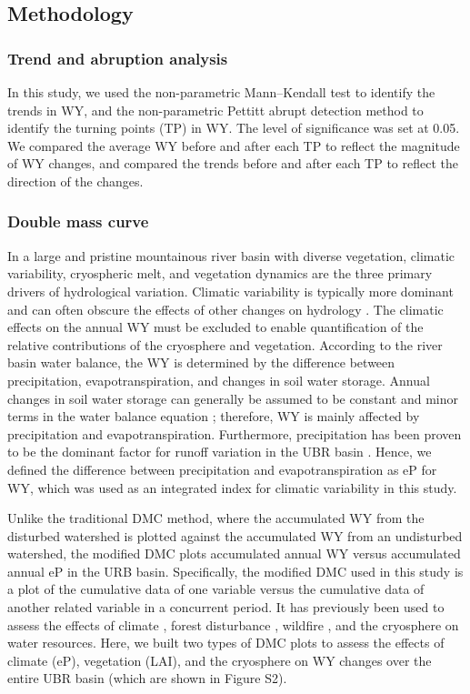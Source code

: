 \documentclass[hess, manuscript]{copernicus}
\begin{document}
\subsection{Methodology}
\subsubsection{Trend and abruption analysis}
In this study, we used the non-parametric Mann--Kendall test \citep{kendall1938new,mann1945nonparametric} to identify the trends in WY, and the non-parametric Pettitt abrupt detection method \citep{pettitt1979non} to identify the turning points (TP) in WY. The level of significance was set at 0.05. We compared the average WY before and after each TP to reflect the magnitude of WY changes, and compared the trends before and after each TP to reflect the direction of the changes.

\subsubsection{Double mass curve}
In a large and pristine mountainous river basin with diverse vegetation, climatic variability, cryospheric melt, and vegetation dynamics are the three primary drivers of hydrological variation. Climatic variability is typically more dominant and can often obscure the effects of other changes on hydrology \citep{cong2009hydrological}. The climatic effects on the annual WY must be excluded to enable quantification of the relative contributions of the cryosphere and vegetation. According to the river basin water balance, the WY is determined by the difference between precipitation, evapotranspiration, and changes in soil water storage. Annual changes in soil water storage can generally be assumed to be constant and minor terms in the water balance equation \citep{wei2010quantifying, zhang2001response}; therefore, WY is mainly affected by precipitation and evapotranspiration. Furthermore, precipitation has been proven to be the dominant factor for runoff variation in the UBR basin \citep{li2019spatiotemporal, wang2021vanishing,xin2021quantifying}. Hence, we defined the difference between precipitation and evapotranspiration as eP for WY, which was used as an integrated index for climatic variability in this study.

Unlike the traditional DMC method, where the accumulated WY from the disturbed watershed is plotted against the accumulated WY from an undisturbed watershed, the modified DMC plots accumulated annual WY versus accumulated annual eP in the URB basin. Specifically, the modified DMC used in this study is a plot of the cumulative data of one variable versus the cumulative data of another related variable in a concurrent period. It has previously been used to assess the effects of climate \citep{gao2011changes}, forest disturbance \citep{wei2010quantifying}, wildfire \citep{hallema2018burned}, and the cryosphere \citep{brahney2017determining} on water resources. Here, we built two types of DMC plots to assess the effects of climate (eP), vegetation (LAI), and the cryosphere on WY changes over the entire UBR basin (which are shown in Figure S2).
\end{document}
